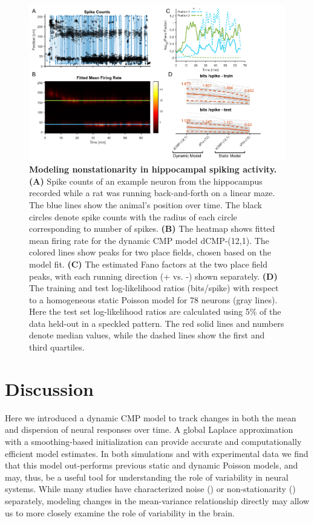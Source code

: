 \documentclass[aoas]{imsart}
\theoremstyle{plain}
\theoremstyle{remark}
\begin{document}
\begin{figure}[h!]
	\centering
	\includegraphics[width=1\textwidth]{figure5.png}
	\caption{\textbf{Modeling nonstationarity in hippocampal spiking activity. (A)} Spike counts of an example neuron from the hippocampus recorded while a rat was running back-and-forth on a linear maze. The blue lines show the animal’s position over time. The black circles denote spike counts with the radius of each circle corresponding to number of spikes. \textbf{(B)} The heatmap shows fitted mean firing rate for the dynamic CMP model dCMP-(12,1). The colored lines show peaks for two place fields, chosen based on the model fit. \textbf{(C)} The estimated Fano factors at the two place field peaks, with each running direction (+ vs. -) shown separately. \textbf{(D)} The training and test log-likelihood ratios (bits/spike) with respect to a homogeneous static Poisson model for 78 neurons (gray lines). Here the test set log-likelihood ratios are calculated using 5\% of the data held-out in a speckled pattern. The red solid lines and numbers denote median values, while the dashed lines show the first and third quartiles.}
	\label{fig5}
\end{figure}

\section{Discussion}
Here we introduced a dynamic CMP model to track changes in both the mean and dispersion of neural responses over time. A global Laplace approximation with a smoothing-based initialization can provide accurate and computationally efficient model estimates. In both simulations and with experimental data we find that this model out-performs previous static and dynamic Poisson models, and may, thus, be a useful tool for understanding the role of variability in neural systems. While many studies have characterized noise (\cite{DeWeese2003,Deweese2004,Taouali2016}) or non-stationarity (\cite{Tomko1974,Wu2008}) separately, modeling changes in the mean-variance relationship directly may allow us to more closely examine the role of variability in the brain. 
\end{document}
